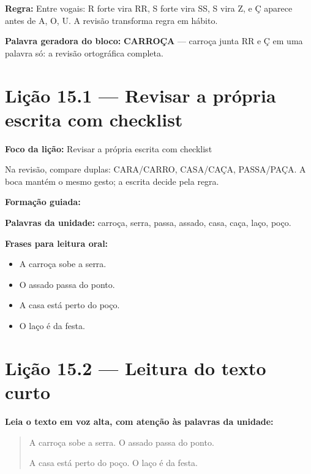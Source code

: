 \textbf{Regra:} Entre vogais: R forte vira RR, S forte vira SS, S vira Z, e Ç aparece antes de A, O, U. A revisão transforma regra em hábito.

\textbf{Palavra geradora do bloco:} \textbf{CARROÇA} --- carroça junta RR e Ç em uma palavra só: a revisão ortográfica completa.

\section{Lição 15.1 --- Revisar a própria escrita com checklist}

\textbf{Foco da lição:} Revisar a própria escrita com checklist


\begin{boquinha}
Na revisão, compare duplas: CARA/CARRO, CASA/CAÇA, PASSA/PAÇA. A boca mantém o mesmo gesto; a escrita decide pela regra.
\end{boquinha}

\noindent\textbf{Formação guiada:}

\begin{center}
\end{center}

\noindent\textbf{Palavras da unidade:} carroça, serra, passa, assado, casa, caça, laço, poço.

\noindent\textbf{Frases para leitura oral:}
\begin{itemize}[leftmargin=1.6em]
  \item A carroça sobe a serra.
  \item O assado passa do ponto.
  \item A casa está perto do poço.
  \item O laço é da festa.
\end{itemize}

\section{Lição 15.2 --- Leitura do texto curto}

\noindent\textbf{Leia o texto em voz alta, com atenção às palavras da unidade:}


\begin{quote}
A carroça sobe a serra. O assado passa do ponto.

A casa está perto do poço. O laço é da festa.
\end{quote}

